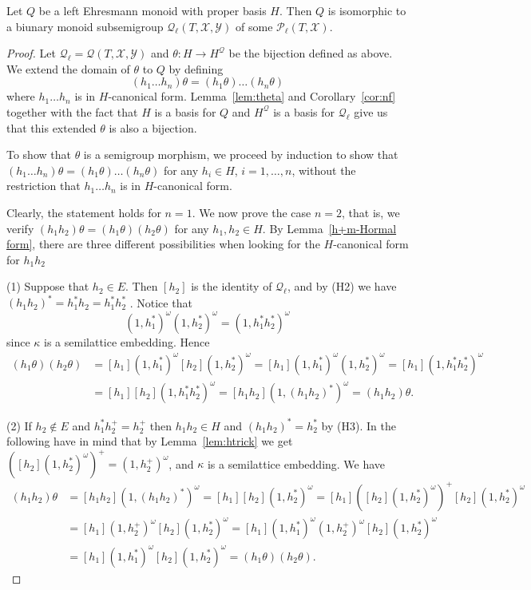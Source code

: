 \documentclass[10pt,a4paper]{amsart}
\newcommand{\QQ}{\mbox{$\mathcal{Q}_\ell$}}
\newcommand{\X}{\mathcal{X}}
\newcommand{\Y}{\mathcal{Y}}
\begin{document}
\begin{them}\label{them:main}   Let $Q$
be a left Ehresmann monoid with proper  basis $H$. Then $Q$ is isomorphic to  a  biunary monoid subsemigroup  $\QQ(T,\X,\Y)$ of some $\mathcal{P}_{\ell}(T,\X)$. 

\end{them}

\begin{proof} Let  $\QQ=\mathcal{Q}(T, \X , \Y)$ and $\theta:H\rightarrow H^{\mathcal{Q}}$ be the bijection defined as above. We extend the domain of $\theta$ to $Q$ by  defining 
\[(h_1\dots h_n)\theta=(h_1\theta)\dots (h_n\theta)\]
where $h_1\dots h_n$ is in $H$-canonical form. Lemma~\ref{lem:theta}  and Corollary~\ref{cor:nf} together with the fact that $H$ is a basis for $Q$ and $H^{\mathcal{Q}}$ is a basis for $\QQ$ give  us that this extended $\theta$ is also a bijection.



To show that $\theta$ is a  semigroup morphism, we proceed by induction to show  that $(h_1\dots h_n)\theta=(h_1\theta)\dots (h_n\theta)$ for any $h_i \in H$, $i = 1, \dots, n$, without the restriction that $h_1\dots h_n$ is in $H$-canonical form.

  Clearly, the statement  holds for $n =1$.  We now prove the case $n=2$, that is, we verify $(h_1h_2)\theta = (h_1\theta)( h_2\theta)$ for any $h_1,h_2\in H$.  By Lemma~\ref{h+m-Hormal form}, there are three  different possibilities when looking for the $H$-canonical form for $h_1h_2$

  (1) Suppose that $h_2\in E$. Then $[h_2]$ is the identity of $\QQ$,  and  by (H2)
we have $(h_1h_2)^* = h_1^*h_2= h_1^* h_2^*$ . Notice that  $$(1, h_1^*)^\omega(1, h_2^*)^\omega =(1, h_1^*h_2^*)^\omega$$ 
since $\kappa$ is a semilattice embedding. 
Hence
\[
\begin{aligned}
(h_1\theta)( h_2\theta) &= [h_1](1, h_1^*)^\omega[h_2](1, h_2^*)^\omega=[h_1](1, h_1^*)^\omega(1, h_2^*)^\omega=[h_1](1, h_1^*h_2^*)^\omega\\
        &=[h_1][h_2](1, h_1^*h_2^*)^\omega=[h_1h_2](1,(h_1h_2)^*)^\omega=(h_1h_2)\theta.\
\end{aligned}
\]


(2)
If $h_2\notin E$  and $h_1^* h_2^+= h_2^+$  then $h_1h_2 \in H$ and $(h_1h_2)^* = h_2^*$ by (H3). In the following have in mind that by Lemma~\ref{lem:htrick}  we  get $([h_2](1, h_2^*)^\omega)^+ = (1,h_2^+)^\omega$, and $\kappa$ is a semilattice embedding. We have   
\[
\begin{aligned}
(h_1h_2)\theta & = [h_1h_2](1, (h_1h_2)^*)^\omega
               =[h_1][h_2](1, h_2^*)^\omega=[h_1]([h_2](1, h_2^*)^\omega)^+[h_2](1, h_2^*)^\omega\\
               &=[h_1](1,h_2^+)^\omega[h_2](1, h_2^*)^\omega=[h_1](1,h_1^*)^\omega(1,h_2^+)^\omega[h_2](1, h_2^*)^\omega\\
               &=[h_1](1,h_1^*)^\omega[h_2](1, h_2^*)^\omega=(h_1\theta )(h_2\theta).
\end{aligned}
\]


\end{proof}
\end{document}
